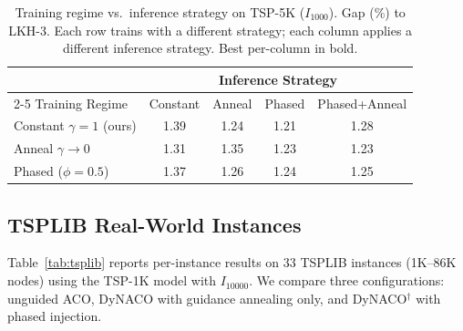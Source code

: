 \documentclass[sigconf,nonacm]{acmart}
\begin{document}
\begin{table}[h]
\centering
\caption{Training regime vs.\ inference strategy on TSP-5K ($I_{1000}$). Gap (\%) to LKH-3. Each row trains with a different strategy; each column applies a different inference strategy. Best per-column in bold.}
\label{tab:train-strategy}
\small
\begin{tabular}{lcccc}
\toprule
& \multicolumn{4}{c}{Inference Strategy} \\
\cmidrule(lr){2-5}
Training Regime & Constant & Anneal & Phased & Phased+Anneal \\
\midrule
Constant $\gamma{=}1$ (ours)               & 1.39 & 1.24 & 1.21 & 1.28 \\
Anneal $\gamma{\to}0$                       & 1.31 & 1.35 & 1.23 & 1.23 \\
Phased ($\phi{=}0.5$)                       & 1.37 & 1.26 & 1.24 & 1.25 \\
\bottomrule
\end{tabular}
\end{table}

\subsection{TSPLIB Real-World Instances}
\label{app:tsplib}

Table~\ref{tab:tsplib} reports per-instance results on 33 TSPLIB instances (1K--86K nodes) using the TSP-1K model with $I_{10000}$.
We compare three configurations: unguided ACO, DyNACO with guidance annealing only, and DyNACO$^{\dagger}$ with phased injection.
\end{document}
